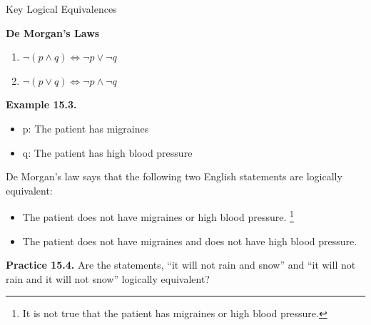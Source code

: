 \documentclass[aspectratio=169]{beamer}
\providecommand{\Blue}[1]{\textcolor{blue}{#1}}
\providecommand{\Red}[1]{\textcolor{red}{#1}}
\begin{document}
\begin{frame}[plain]{Key Logical Equivalences}  

 {\bf De Morgan's Laws}
      \begin{enumerate}
        \item $\neg (p\wedge q) \Leftrightarrow \neg p \vee \neg q$
        \item $\neg (p\vee q) \Leftrightarrow \neg p \wedge \neg q$
      \end{enumerate}
 
 \pause 
\medskip

 {\bf Example 15.3.} 
   \begin{itemize}
    \item p:  The patient has migraines
    \item q: The patient has high blood pressure
   \end{itemize}


    De Morgan's law says that the following two English statements are
logically equivalent:
   \begin{itemize}
    \item The patient does not have migraines or high blood pressure.
    \footnote{ 
     It is not true that the patient has migraines or high blood pressure.}
    \item The patient does not have migraines and does not have high blood pressure.
   \end{itemize}
\pause 
  
  {\bf Practice 15.4.} Are the statements, ``it will not rain and snow” 
   and ``it will not rain and it will not snow” logically equivalent?
  
\end{frame}
\end{document}
